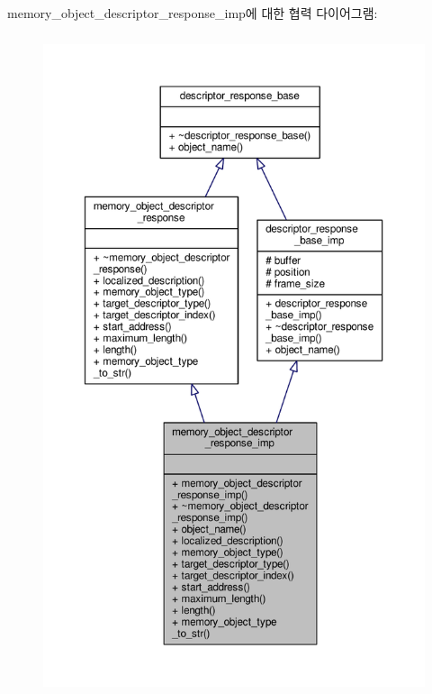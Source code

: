 memory\+\_\+object\+\_\+descriptor\+\_\+response\+\_\+imp에 대한 협력 다이어그램\+:
\nopagebreak
\begin{figure}[H]
\begin{center}
\leavevmode
\includegraphics[height=550pt]{classavdecc__lib_1_1memory__object__descriptor__response__imp__coll__graph}
\end{center}
\end{figure}
